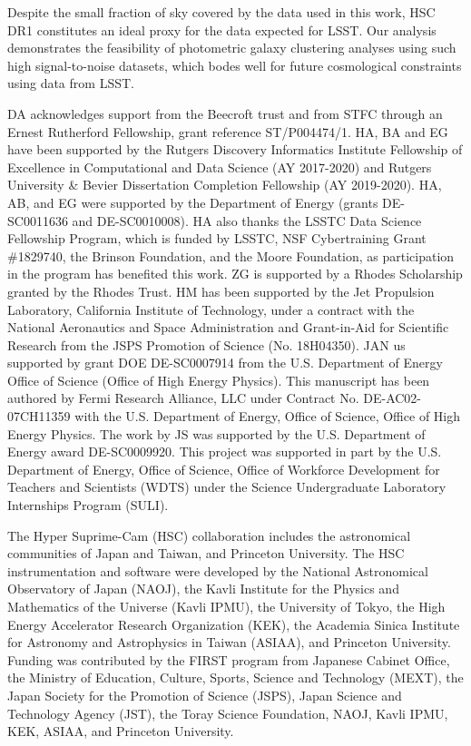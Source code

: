 \documentclass[a4paper,11pt]{article}
\begin{document}
  Despite the small fraction of sky covered by the data used in this work, HSC DR1 constitutes an ideal proxy for the data expected for LSST. Our analysis demonstrates the feasibility of photometric galaxy clustering analyses using such high signal-to-noise datasets, which bodes well for future cosmological constraints using data from LSST.


\acknowledgments

DA acknowledges support from the Beecroft trust and from STFC through
an Ernest Rutherford Fellowship, grant reference ST/P004474/1.  HA, BA
and EG have been supported by the Rutgers Discovery Informatics
Institute Fellowship of Excellence in Computational and Data Science
(AY 2017-2020) and Rutgers University \& Bevier Dissertation
Completion Fellowship (AY 2019-2020). HA, AB, and EG were supported by
the Department of Energy (grants DE-SC0011636 and DE-SC0010008). HA
also thanks the LSSTC Data Science Fellowship Program, which is funded
by LSSTC, NSF Cybertraining Grant \#1829740, the Brinson Foundation,
and the Moore Foundation, as participation in the program has
benefited this work. ZG is supported by a Rhodes Scholarship granted
by the Rhodes Trust. HM has been supported by the Jet Propulsion Laboratory,
California Institute of Technology, under a contract with the National
Aeronautics and Space Administration and Grant-in-Aid for Scientific
Research from the JSPS Promotion of Science (No. 18H04350). 
JAN us supported by grant DOE DE-SC0007914 from
the U.S. Department of Energy Office of Science (Office of High Energy
Physics). This manuscript has been authored by Fermi Research
Alliance, LLC under Contract No. DE-AC02-07CH11359 with the
U.S. Department of Energy, Office of Science, Office of High Energy
Physics. The work by JS was supported by the U.S. Department of Energy
award DE-SC0009920. This project was supported in part by the
U.S. Department of Energy, Office of Science, Office of Workforce
Development for Teachers and Scientists (WDTS) under the Science
Undergraduate Laboratory Internships Program (SULI).

The Hyper Suprime-Cam (HSC) collaboration includes the astronomical communities of Japan and Taiwan, and Princeton University. The HSC instrumentation and software were developed by the National Astronomical Observatory of Japan (NAOJ), the Kavli Institute for the Physics and Mathematics of the Universe (Kavli IPMU), the University of Tokyo, the High Energy Accelerator Research Organization (KEK), the Academia Sinica Institute for Astronomy and Astrophysics in Taiwan (ASIAA), and Princeton University. Funding was contributed by the FIRST program from Japanese Cabinet Office, the Ministry of Education, Culture, Sports, Science and Technology (MEXT), the Japan Society for the Promotion of Science (JSPS), Japan Science and Technology Agency (JST), the Toray Science Foundation, NAOJ, Kavli IPMU, KEK, ASIAA, and Princeton University. 
\end{document}
